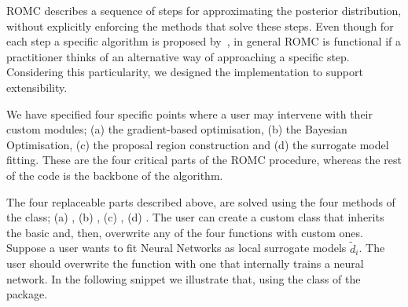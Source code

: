 ROMC describes a sequence of steps for approximating the posterior
distribution, without explicitly enforcing the methods that solve
these steps. Even though for each step a specific algorithm is
proposed by~\cite{Ikonomov2019}, in general ROMC is functional if a
practitioner thinks of an alternative way of approaching a specific
step. Considering this particularity, we designed the implementation
to support extensibility.

We have specified four specific points where a user may intervene with
their custom modules; (a) the gradient-based optimisation, (b) the
Bayesian Optimisation, (c) the proposal region construction and (d)
the surrogate model fitting. These are the four critical parts of the
ROMC procedure, whereas the rest of the code is the backbone of the
algorithm.

The four replaceable parts described above, are solved using the four
methods of the \linebreak {} class; (a)
, (b) ,
\linebreak (c) , (d)
. The user can create a custom
class that inherits the basic  and, then,
overwrite any of the four functions with custom ones. Suppose a user
wants to fit Neural Networks as local surrogate models
\(\tilde{d}_i\). The user should overwrite the
 function with one that internally
trains a neural network. In the following snippet we illustrate that,
using the  class of the
 package.

